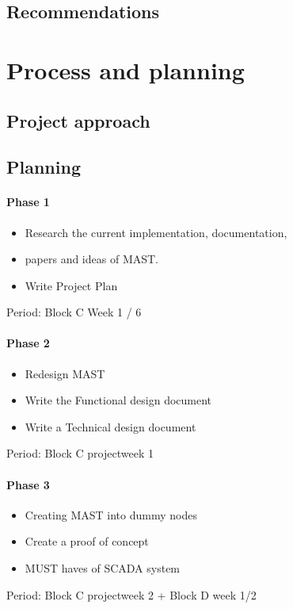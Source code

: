\documentclass[12pt,a4paper]{report}
\begin{document}
\newpage
\section{Recommendations}

\chapter{Process and planning}
\section{Project  approach}

\newpage
\section{Planning}
\subsubsection{Phase 1}
\begin{itemize}
\item Research the current implementation, documentation, \item papers and ideas of MAST.
\item Write Project Plan
\end{itemize}
Period: Block C Week 1 / 6

\subsubsection{Phase 2}
\begin{itemize}
\item Redesign MAST
\item Write the Functional design document
\item Write a Technical design document
\end{itemize}
Period: Block C projectweek 1

\subsubsection{Phase 3}
\begin{itemize}
\item Creating MAST into dummy nodes
\item Create a proof of concept
\item MUST haves of SCADA system
\end{itemize}
Period: Block C projectweek 2 + Block D week 1/2
\end{document}
